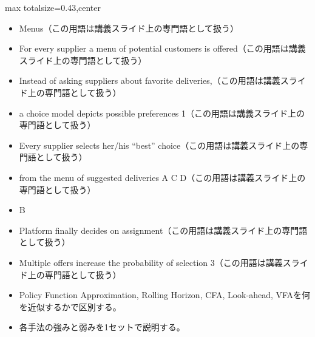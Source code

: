 \clearpage
{}
\begin{minipage}[t]{0.405\textwidth}
\begin{adjustbox}{max totalsize={\textwidth}{0.43\textheight},center}
\begin{minipage}{\textwidth}\scriptsize
{}\begin{itemize}
\item Menus（この用語は講義スライド上の専門語として扱う）
\item For every supplier a menu of potential customers is offered（この用語は講義スライド上の専門語として扱う）
\item Instead of asking suppliers about favorite deliveries,（この用語は講義スライド上の専門語として扱う）
\item a choice model depicts possible preferences 1（この用語は講義スライド上の専門語として扱う）
\item Every supplier selects her/his “best” choice（この用語は講義スライド上の専門語として扱う）
\item from the menu of suggested deliveries A C D（この用語は講義スライド上の専門語として扱う）
\item B
\item Platform finally decides on assignment（この用語は講義スライド上の専門語として扱う）
\item Multiple offers increase the probability of selection 3（この用語は講義スライド上の専門語として扱う）
\end{itemize}\begin{itemize}
\item Policy Function Approximation, Rolling Horizon, CFA, Look-ahead, VFAを何を近似するかで区別する。
\item 各手法の強みと弱みを1セットで説明する。
\end{itemize}
\end{minipage}
\end{adjustbox}
\end{minipage}\hfill
